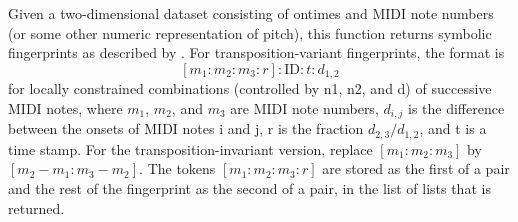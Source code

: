 \noindent Given a two-dimensional dataset consisting
of ontimes and MIDI note numbers (or some other
numeric representation of pitch), this function
returns symbolic fingerprints as described by
\cite{arzt2012}. For transposition-variant
fingerprints, the format is
$$[m_1 : m_2 : m_3 : r] : \text{ID} : t : d_{1,2}$$
for locally constrained combinations (controlled by
n1, n2, and d) of successive MIDI notes, where $m_1$,
$m_2$, and $m_3$ are MIDI note numbers, $d_{i,j}$ is
the difference between the onsets of MIDI notes i and
j, r is the fraction $d_{2,3}/d_{1,2}$, and t is a
time stamp. For the transposition-invariant version,
replace $[m_1 : m_2 : m_3]$ by
$[m_2 - m_1 : m_3 - m_2]$. The tokens
$[m_1 : m_2 : m_3 : r]$ are stored as the first of a
pair and the rest of the fingerprint as the second of
a pair, in the list of lists that is returned.

